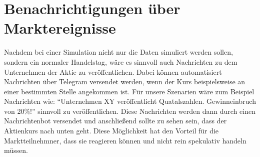 \section{Benachrichtigungen über Marktereignisse}
Nachdem bei einer Simulation nicht nur die Daten simuliert werden sollen, sondern ein normaler Handelstag, wäre es sinnvoll auch Nachrichten 
zu dem Unternehmen der Aktie zu veröffentlichen. Dabei können automatisiert Nachrichten über Telegram versendet werden, wenn der Kurs beispielsweise 
an einer bestimmten Stelle angekommen ist. Für unsere Szenarien wäre zum Beispiel Nachrichten wie: \enquote{Unternehmen XY veröffentlicht Quatalszahlen. 
Gewinneinbruch von 20\%!} sinnvoll zu veröffentlichen. Diese Nachrichten werden dann durch einen Nachrichtenbot versendet und anschließend sollte zu 
sehen sein, dass der Aktienkurs nach unten geht. Diese Möglichkeit hat den Vorteil für die Marktteilnehmner, dass sie reagieren können und nicht 
rein spekulativ handeln müssen.
